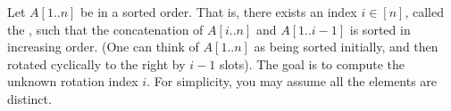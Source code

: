 \documentclass[10pt]{article}
\begin{document}





Let \( A[1..n] \) be in a  sorted order. That is, there exists an index \( i \in [n] \), called the , such that the concatenation of \( A[i..n] \) and \( A[1..i - 1] \) is sorted in increasing order. (One can think of \( A[1..n] \) as being sorted initially, and then rotated cyclically to the right by \( i - 1 \) slots). The goal is to compute the unknown rotation index \( i \). For simplicity, you may assume all the elements are distinct.
\end{document}
